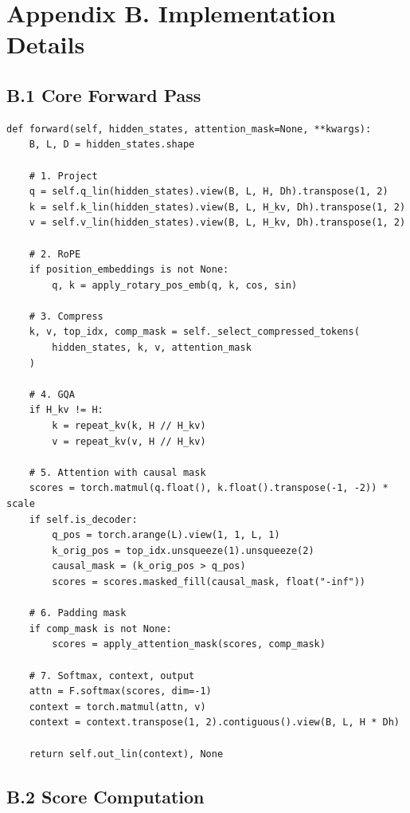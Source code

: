 \section{Appendix B. Implementation Details}

\subsection{B.1 Core Forward Pass}

\begin{lstlisting}
def forward(self, hidden_states, attention_mask=None, **kwargs):
    B, L, D = hidden_states.shape
    
    # 1. Project
    q = self.q_lin(hidden_states).view(B, L, H, Dh).transpose(1, 2)
    k = self.k_lin(hidden_states).view(B, L, H_kv, Dh).transpose(1, 2)
    v = self.v_lin(hidden_states).view(B, L, H_kv, Dh).transpose(1, 2)
    
    # 2. RoPE
    if position_embeddings is not None:
        q, k = apply_rotary_pos_emb(q, k, cos, sin)
    
    # 3. Compress
    k, v, top_idx, comp_mask = self._select_compressed_tokens(
        hidden_states, k, v, attention_mask
    )
    
    # 4. GQA
    if H_kv != H:
        k = repeat_kv(k, H // H_kv)
        v = repeat_kv(v, H // H_kv)
    
    # 5. Attention with causal mask
    scores = torch.matmul(q.float(), k.float().transpose(-1, -2)) * scale
    if self.is_decoder:
        q_pos = torch.arange(L).view(1, 1, L, 1)
        k_orig_pos = top_idx.unsqueeze(1).unsqueeze(2)
        causal_mask = (k_orig_pos > q_pos)
        scores = scores.masked_fill(causal_mask, float("-inf"))
    
    # 6. Padding mask
    if comp_mask is not None:
        scores = apply_attention_mask(scores, comp_mask)
    
    # 7. Softmax, context, output
    attn = F.softmax(scores, dim=-1)
    context = torch.matmul(attn, v)
    context = context.transpose(1, 2).contiguous().view(B, L, H * Dh)
    
    return self.out_lin(context), None
\end{lstlisting}

\subsection{B.2 Score Computation}

